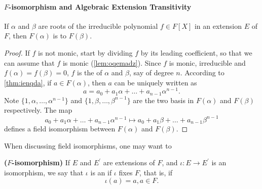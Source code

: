 \documentclass{article}
\newcommand{\bfs}[1]{\textbf{({#1}) }}
\begin{document}
\paragraph{$F$-isomorphism and Algebraic Extension Transitivity}
\begin{thma}\label{thm:qdfhtgdaf}
If $\alpha$ and $\beta$ are roots of the irreducible polynomial $f \in F[X]$ in an extension $E$ of $F$, then $F(\alpha)$ is  to $F(\beta)$.
\begin{figure}[h]

\centering
{} %

\end{figure}
\end{thma}
\begin{proof}
If $f$ is not monic, start by dividing $f$ by its leading coefficient, so that we can assume that $f$ is monic (\cref{lem:oqemadz}). Since $f$ is monic, irreducible and $f(\alpha)=f(\beta)=0$, $f$ is the  of $\alpha$ and $\beta$, say of degree $n$. According to \cref{thm:ienqda}, if $a \in F(\alpha)$, then $a$ can be uniquely written as
$$
a=a_{0}+a_{1} \alpha+\ldots+a_{n-1} \alpha^{n-1} .
$$
Note $\{1,\alpha,\ldots,\alpha^{n-1}\}$ and $\{1,\beta,\ldots,\beta^{n-1}\}$ are the two basis in $F(\alpha)$ and $F(\beta)$ respectively. The map
$$
a_{0}+a_{1} \alpha+\ldots+a_{n-1} \alpha^{n-1} \mapsto a_{0}+a_{1} \beta+\ldots+a_{n-1} \beta^{n-1}
$$
defines a field isomorphism between $F(\alpha)$ and $F(\beta)$. 
\end{proof}
When discussing field isomorphisms, one may want to 
\begin{defa}\bfs{$F$-isomorphism}
 If $E$ and $E^{\prime}$ are extensions of $F$, and $\iota: E \rightarrow E^{\prime}$ is an isomorphism, we say that $\iota$ is an  if $\iota$ fixes $F$, that is, if
$$
\iota(a)=a, a \in F .
$$
\end{defa}
\end{document}
